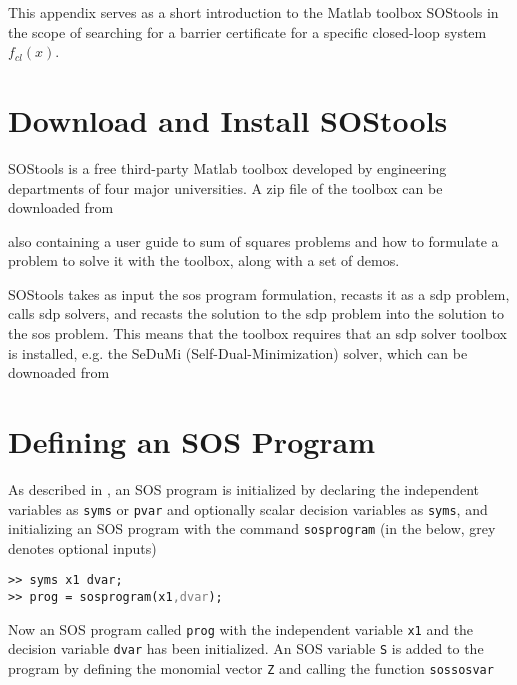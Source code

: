 This appendix serves as a short introduction to the Matlab toolbox SOStools in the scope of searching for a barrier certificate for a specific closed-loop system $f_{cl}(x)$.

\section{Download and Install SOStools}
SOStools is a free third-party Matlab toolbox developed by engineering departments of four major universities. A zip file of the toolbox can be downloaded from 

\hspace{1cm} {}

also containing a user guide \citep{bib:sostools_manual} to sum of squares problems and how to formulate a problem to solve it with the toolbox, along with a set of demos. 

SOStools takes as input the \gls{sos} program formulation, recasts it as a \gls{sdp} problem, calls \gls{sdp} solvers, and recasts the solution to the \gls{sdp} problem into the solution to the \gls{sos} problem. This means that the toolbox requires that an \gls{sdp} solver toolbox is installed, e.g. the SeDuMi (Self-Dual-Minimization) solver, which can be downoaded from

\hspace{1cm} {}

\section{Defining an SOS Program}
As described in \citep{bib:sostools_manual}, an SOS program is initialized by declaring the independent variables as \texttt{syms} or \texttt{pvar} and optionally scalar decision variables as \texttt{syms}, and initializing an SOS program with the command \texttt{sosprogram} (in the below, grey denotes optional inputs)

\hspace*{1cm} \texttt{>> syms x1 dvar;}\\
\hspace*{1cm} \texttt{>> prog = sosprogram(x1\textcolor{grey}{,dvar});}

Now an SOS program called \texttt{prog} with the independent variable \texttt{x1} and the decision variable \texttt{dvar} has been initialized. An SOS variable \texttt{S} is added to the program by defining the monomial vector \texttt{Z} and calling the function \texttt{sossosvar}

